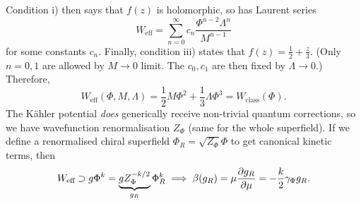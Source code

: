 Condition i) then says that $f(z)$ is holomorphic, so has Laurent series
\begin{equation}
  W_{\text{eff}} = \sum_{n = 0}^{\infty} c_n \frac{\Phi^{n - 2} \Lambda^n}{M^{n -1}}
\end{equation}
for some constants $c_n$.
Finally, condition iii) states that $f(z) = \frac{1}{2} + \frac{z}{3}$. (Only $n = 0, 1$ are allowed by $M \to 0$ limit. The $c_0, c_1$ are then fixed by $\Lambda \to 0$.)
Therefore,
\begin{equation}
  W_{\text{eff}}(\Phi, M, \Lambda) = \frac{1}{2} M \Phi^2 + \frac{1}{3} \Lambda \Phi^3 = W_{\text{class}}(\Phi).
\end{equation}
The Kähler potential \emph{does} generically receive non-trivial quantum corrections, so we have wavefunction renormalisation $Z_\Phi$ (same for the whole superfield).
If we define a renormalised chiral superfield $\Phi_R = \sqrt{Z_\Phi} \Phi$ to get canonical kinetic terms, then
\begin{equation}
  W_{\text{eff}}\supset g \Phi^k = \underbrace{g Z_\Phi^{-k / 2}}_{\mathclap{g_R}} \Phi_R^k \implies \beta(g_R) = \mu \frac{\partial g_R}{\partial \mu} = - \frac{k}{2} \gamma_{\Phi} g_R.
\end{equation}

